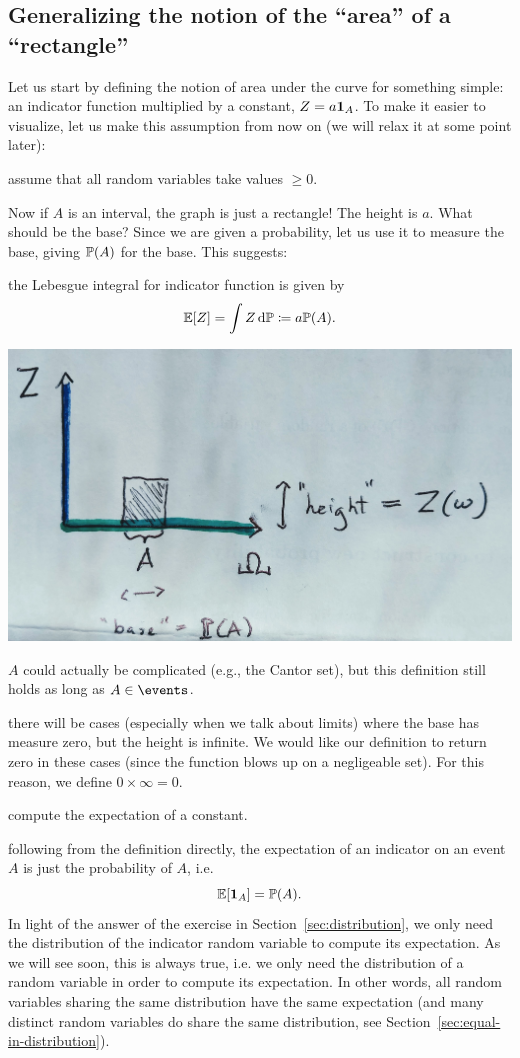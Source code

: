 \documentclass{article}
\begin{document}
\subsection{Generalizing the notion of the ``area'' of a ``rectangle''}

Let us start by defining the notion of area under the curve for something simple: an indicator function multiplied by a constant, $Z = a \1_A$. To make it easier to visualize, let us make this assumption from now on (we will relax it at some point later):

 assume that all random variables take values $\ge 0$.

Now if $A$ is an interval, the graph is just a rectangle! The height is $a$. What should be the base? Since we are given a probability, let us use it to measure the base, giving $\P(A)$ for the base. This suggests:

 the Lebesgue integral for indicator function is given by 
\[ \E[Z] = \int Z \ud \P \defeq a \P(A). \]
\begin{center}
	\includegraphics[width=0.5\linewidth]{figures/rectangle}
\end{center}

 $A$ could actually be complicated (e.g., the Cantor set), but this definition still holds as long as $A \in \events$.

 there will be cases (especially when we talk about limits) where the base has measure zero, but the height is infinite. We would like our definition to return zero in these cases (since the function blows up on a negligeable set). For this reason, we define $0 \times \infty = 0$.

 compute the expectation of a constant.

 following from the definition directly, the expectation of an indicator on an event $A$ is just the probability of $A$, i.e. \[\E[\1_A] = \P(A).\] In light of the answer of the exercise in Section~\ref{sec:distribution}, we only need the distribution of the indicator random variable to compute its expectation. As we will see soon, this is always true, i.e. we only need the distribution of a random variable in order to compute its expectation. In other words, all random variables sharing the same distribution have the same expectation (and many distinct random variables do share the same distribution, see Section~\ref{sec:equal-in-distribution}). 
\end{document}
